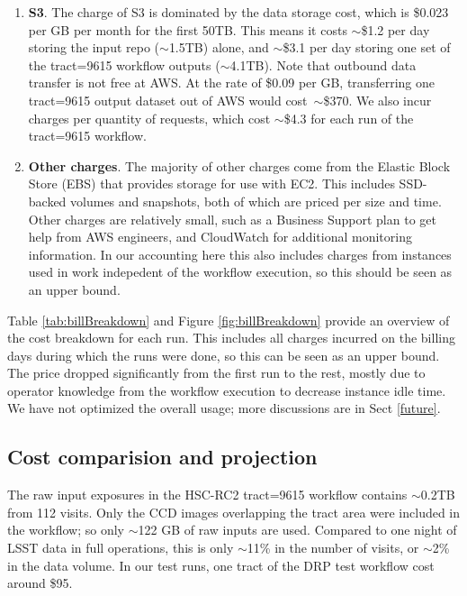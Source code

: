 \begin{enumerate}
\item \textbf{S3}.
The charge of S3 is dominated by the data storage cost, which is \$0.023 per GB per month for the first 50TB.
This means it costs $\sim$\$1.2 per day storing the input repo ($\sim$1.5TB) alone, and $\sim$\$3.1 per day storing one set of the tract=9615 workflow outputs ($\sim$4.1TB).
Note that outbound data transfer is not free at AWS.
At the rate of \$0.09 per GB, transferring one tract=9615 output dataset out of AWS would cost~$\sim$\$370.
We also incur charges per quantity of requests, which cost $\sim$\$4.3 for each run of the tract=9615 workflow.

\item \textbf{Other charges}.
The majority of other charges come from the Elastic Block Store (EBS) that provides storage for use with EC2.
This includes SSD-backed volumes and snapshots, both of which are priced per size and time.
Other charges are relatively small, such as a Business Support plan to get help from AWS engineers, and CloudWatch for additional monitoring information.
In our accounting here this also includes charges from instances used in work indepedent of the workflow execution, so this should be seen as an upper bound.

\end{enumerate}

Table \ref{tab:billBreakdown} and Figure \ref{fig:billBreakdown} provide an overview of the cost breakdown for each run.
This includes all charges incurred on the billing days during which the runs were done, so this can be seen as an upper bound.
The price dropped significantly from the first run to the rest, mostly due to operator knowledge from the workflow execution to decrease instance idle time.
We have not optimized the overall usage; more discussions are in Sect \ref{future}.



\subsection{Cost comparision and projection}

The raw input exposures in the HSC-RC2 tract=9615 workflow contains $\sim$0.2TB from 112 visits.
Only the CCD images overlapping the tract area were included in the workflow; so only $\sim$122 GB of raw inputs are used.
Compared to one night of LSST data in full operations, this is only $\sim$11\% in the number of visits, or $\sim$2\% in the data volume.
In our test runs, one tract of the DRP test workflow cost around \$95.

